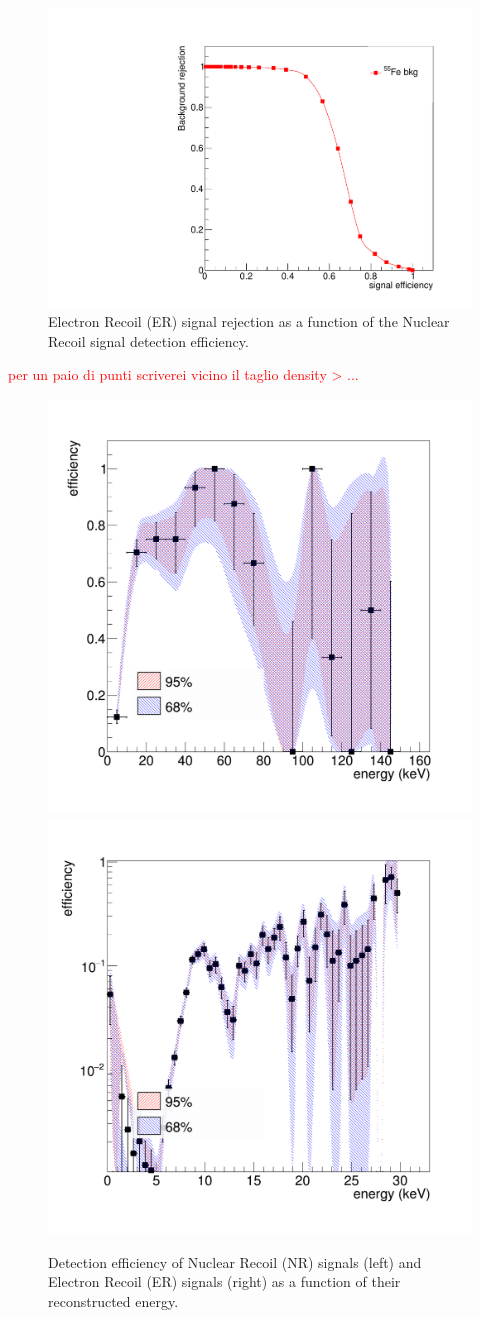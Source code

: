 \documentclass[12pt]{iopart}
\begin{document}
\begin{figure}[ht]
	\centering
	\includegraphics[width=0.50\linewidth]{density_roc.pdf}
  	\caption{Electron Recoil (ER) signal rejection as a function of the Nuclear Recoil signal detection efficiency.}
  	\label{fig:roc}
\end{figure}
\textcolor{red}{per un paio di punti scriverei vicino il taglio density > ...}

\begin{figure}[ht]
	\centering
	\includegraphics[width=0.45\linewidth]{effS.png}	\includegraphics[width=0.45\linewidth]{effB.png}
  	\caption{Detection efficiency of Nuclear Recoil (NR) signals (left) and Electron Recoil (ER) signals (right) as a function of their reconstructed energy.}
  	\label{fig:effB}
\end{figure}
\end{document}
